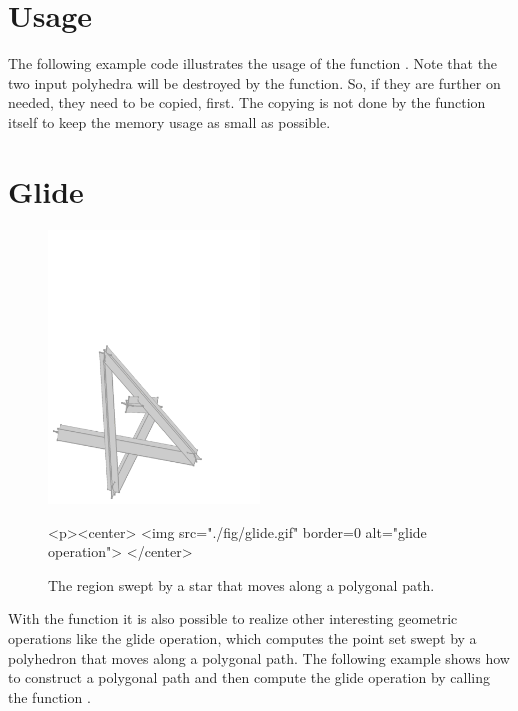 \section{Usage}

The following example code illustrates the usage of the function
. Note that the two input polyhedra will be
destroyed by the function. So, if they are further on needed, they
need to be copied, first. The copying is not done by the function
itself to keep the memory usage as small as possible.


\section{Glide}

\begin{figure}
  \begin{ccTexOnly}
    \begin{center}
      \includegraphics[width=0.5\textwidth]{Minkowski_sum_3/fig/glide}
    \end{center}
  \end{ccTexOnly}
  \begin{ccHtmlOnly}
    <p><center>
    <img src="./fig/glide.gif" border=0 alt="glide operation">
    </center>
  \end{ccHtmlOnly}
  \caption{The region swept by a star that moves along a polygonal path.}
\end{figure}

With the function  it is also possible to realize
other interesting geometric operations like the glide operation, which
computes the point set swept by a polyhedron that moves along a
polygonal path. The following example shows how to construct a
polygonal path and then compute the glide operation by calling the
function .


